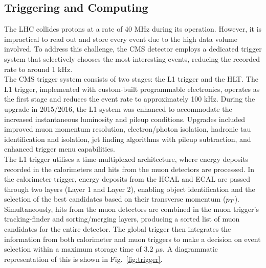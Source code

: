 \subsection{Triggering and Computing}

The \ac{LHC} collides protons at a rate of 40 MHz during its operation. 
However, it is impractical to read out and store every event due to the high data volume involved. 
To address this challenge, the \ac{CMS} detector employs a dedicated trigger system that selectively chooses the most interesting events, reducing the recorded rate to around 1 kHz. \\

The \ac{CMS} trigger system consists of two stages: the \ac{L1} trigger and the \ac{HLT}. 
The \ac{L1} trigger, implemented with custom-built programmable electronics, operates as the first stage and reduces the event rate to approximately 100 kHz. 
During the upgrade in 2015/2016, the \ac{L1} system was enhanced to accommodate the increased instantaneous luminosity and pileup conditions. 
Upgrades included improved muon momentum resolution, electron/photon isolation, hadronic tau identification and isolation, jet finding algorithms with pileup subtraction, and enhanced trigger menu capabilities. \\

The \ac{L1} trigger utilises a time-multiplexed architecture, where energy deposits recorded in the calorimeters and hits from the muon detectors are processed. 
In the calorimeter trigger, energy deposits from the HCAL and ECAL are passed through two layers (Layer 1 and Layer 2), enabling object identification and the selection of the best candidates based on their transverse momentum ($p_{T}$). 
Simultaneously, hits from the muon detectors are combined in the muon trigger's tracking-finder and sorting/merging layers, producing a sorted list of muon candidates for the entire detector. 
The global trigger then integrates the information from both calorimeter and muon triggers to make a decision on event selection within a maximum storage time of 3.2 $\mu$s.
A diagrammatic representation of this is shown in Fig.~\ref{fig:trigger}. \\

